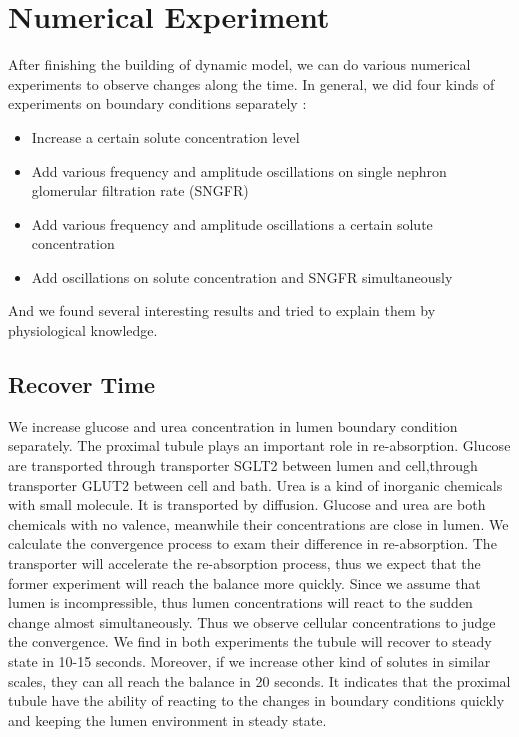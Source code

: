 \documentclass{article}
\begin{document}
\section{Numerical Experiment}
After finishing the building of dynamic model, we can do various numerical experiments to observe changes along the time. In general, we did four kinds of experiments on boundary conditions separately :
\begin{itemize}
	\item Increase a certain solute concentration level
	\item Add various frequency and amplitude oscillations on single nephron glomerular filtration rate (SNGFR) 
	\item Add various frequency and amplitude oscillations a certain solute concentration
	\item Add oscillations on solute concentration and SNGFR simultaneously
\end{itemize}
And we found several interesting results and tried to explain them by physiological knowledge.

\subsection{Recover Time}
We increase glucose and urea concentration in lumen boundary condition separately. The proximal tubule plays an important role in re-absorption. Glucose are transported through transporter SGLT2 between lumen and cell,through transporter GLUT2 between cell and bath. Urea is a kind of inorganic chemicals with small molecule. It is transported by diffusion. Glucose and urea are both chemicals with no valence, meanwhile their concentrations are close in lumen. We calculate the convergence process to exam their difference in re-absorption. The transporter will accelerate the re-absorption process, thus we expect that the former experiment will reach the balance more quickly. Since we assume that lumen is incompressible, thus lumen concentrations will react to the sudden change almost simultaneously. Thus we observe cellular concentrations to judge the convergence. We find in both experiments the tubule will recover to steady state in 10-15 seconds. Moreover, if we increase other kind of solutes in similar scales, they can all reach the balance in 20 seconds. It indicates that the proximal tubule have the ability of reacting to the changes in boundary conditions quickly and keeping the lumen environment in steady state.
\end{document}
